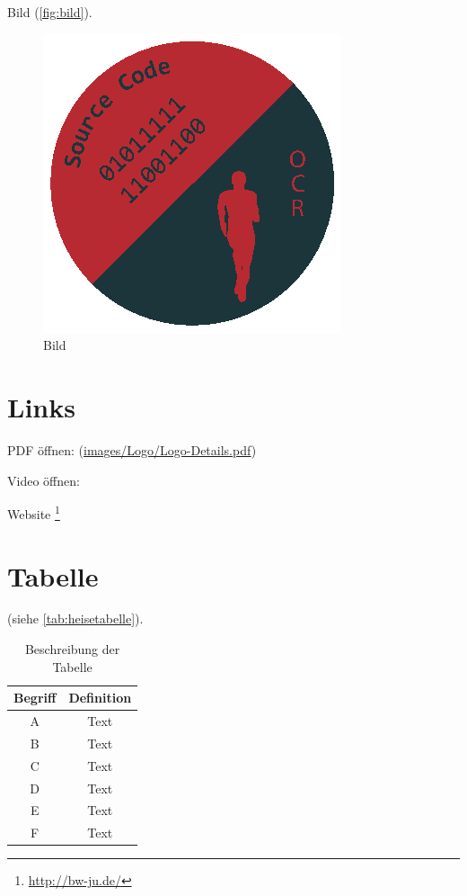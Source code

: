 Bild (\autoref{fig:bild}).
\begin{figure}[!h]%
	\centering
	\includegraphics[width=.55\textwidth]{images/Logo/logo.eps}
	\caption{Bild}\label{fig:bild}%
\end{figure}
 
 
 \section{Links}
 
 PDF öffnen: (\url{images/Logo/Logo-Details.pdf}) 
 
 Video öffnen: 
 
 Website \footnote{\url{http://bw-ju.de/}}

\section{Tabelle}

(siehe \autoref{tab:heisetabelle}).
\begin{table}[ht]
\centering
\begin{tabular}{cc}
\toprule 
\textbf{Begriff} & \textbf{Definition}\\
\midrule  
A	&	Text \\
B	&	Text \\ 
C	&	Text \\
D	&	Text \\
E	&	Text \\
F	&	Text \\
\bottomrule
\end{tabular}
\caption{Beschreibung der Tabelle}
\label{tab:heisetabelle}
\end{table}


